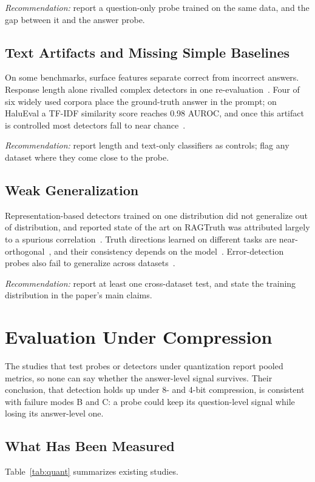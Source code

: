 \documentclass[conference]{IEEEtran}
\begin{document}
\textit{Recommendation:} report a question-only probe trained on the same data, and the gap between it and the answer probe.

\subsection{Text Artifacts and Missing Simple Baselines}
On some benchmarks, surface features separate correct from incorrect answers. Response length alone rivalled complex detectors in one re-evaluation~\cite{illusion2025}. Four of six widely used corpora place the ground-truth answer in the prompt; on HaluEval a TF-IDF similarity score reaches 0.98 AUROC, and once this artifact is controlled most detectors fall to near chance~\cite{hussain2026parallax}.

\textit{Recommendation:} report length and text-only classifiers as controls; flag any dataset where they come close to the probe.

\subsection{Weak Generalization}
Representation-based detectors trained on one distribution did not generalize out of distribution, and reported state of the art on RAGTruth was attributed largely to a spurious correlation~\cite{ood2025}. Truth directions learned on different tasks are near-orthogonal~\cite{orthogonal2025}, and their consistency depends on the model~\cite{geometrytruth2025}. Error-detection probes also fail to generalize across datasets~\cite{orgad2025know}.

\textit{Recommendation:} report at least one cross-dataset test, and state the training distribution in the paper's main claims.

\section{Evaluation Under Compression}
\label{sec:compression}

The studies that test probes or detectors under quantization report pooled metrics, so none can say whether the answer-level signal survives. Their conclusion, that detection holds up under 8- and 4-bit compression, is consistent with failure modes B and C: a probe could keep its question-level signal while losing its answer-level one.

\subsection{What Has Been Measured}
Table~\ref{tab:quant} summarizes existing studies.
\end{document}
